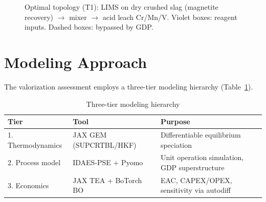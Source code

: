 \documentclass[11pt,a4paper]{article}
\begin{document}
\begin{figure}[H]
\caption{Optimal topology (T1): LIMS on dry crushed slag (magnetite recovery)
         $\to$ mixer $\to$ acid leach Cr/Mn/V.
         Violet boxes: reagent inputs. Dashed boxes: bypassed by GDP.}
\label{fig:pfd}
\end{figure}

\section{Modeling Approach}

The valorization assessment employs a three-tier modeling hierarchy
(Table~\ref{tab:hierarchy}).

\begin{table}[H]
\centering
\caption{Three-tier modeling hierarchy}
\label{tab:hierarchy}
\begin{tabular}{@{}lll@{}}
\toprule
\textbf{Tier} & \textbf{Tool} & \textbf{Purpose} \\
\midrule
1. Thermodynamics & JAX GEM (SUPCRTBL/HKF)  & Differentiable equilibrium speciation \\
2. Process model  & IDAES-PSE + Pyomo            & Unit operation simulation, GDP superstructure \\
3. Economics      & JAX TEA + BoTorch BO            & EAC, CAPEX/OPEX, sensitivity via autodiff \\
\bottomrule
\end{tabular}
\end{table}
\end{document}
